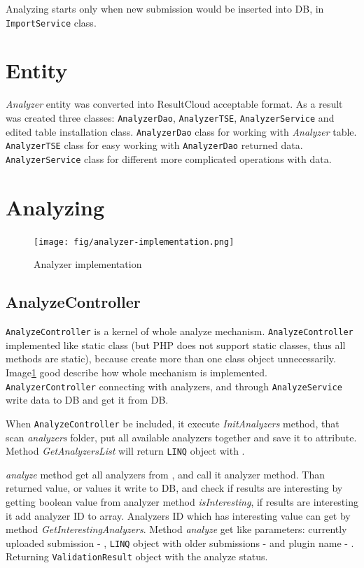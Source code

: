 Analyzing starts only when new submission would be inserted into DB, in \texttt{ImportService} class.

\section{Entity}

\emph{Analyzer} entity was converted into ResultCloud acceptable format. As a result was created three classes: \texttt{AnalyzerDao}, \texttt{AnalyzerTSE}, \texttt{AnalyzerService} and edited table installation class. \texttt{AnalyzerDao} class for working with \emph{Analyzer} table. \texttt{AnalyzerTSE} class for easy working with \texttt{AnalyzerDao} returned data. \texttt{AnalyzerService} class for different more complicated operations with data.

\section{Analyzing}

\begin{figure}
  \centering
    \texttt{[image: fig/analyzer-implementation.png]}
  \caption{Analyzer implementation}
  \label{fig:an_impl}
\end{figure}

\subsection{AnalyzeController}

\texttt{AnalyzeController} is a kernel of whole analyze mechanism. \texttt{AnalyzeController} implemented like static class (but PHP does not support static classes, thus all methods are static), because create more than one class object unnecessarily. Image\ref{fig:an_impl} good describe how whole mechanism is implemented. \texttt{AnalyzerController} connecting with analyzers, and through \texttt{AnalyzeService} write data to DB and get it from DB.

When \texttt{AnalyzeController} be included, it execute \emph{InitAnalyzers} method, that scan \emph{analyzers} folder, put all available analyzers together and save it to \emph{} attribute. Method \emph{GetAnalyzersList} will return \texttt{LINQ} object with \emph{}.

\emph{analyze} method get all analyzers from \emph{}, and call it analyzer method. Than returned value, or values it write to DB, and check if results are interesting by getting boolean value from analyzer method \emph{isInteresting}, if results are interesting it add analyzer ID to \emph{} array. Analyzers ID which has interesting value can get by method \emph{GetInterestingAnalyzers}. Method \emph{analyze} get like parameters: currently uploaded submission - \emph{}, \texttt{LINQ} object with older submissions - \emph{} and plugin name - \emph{}. Returning \texttt{ValidationResult} object with the analyze status.

